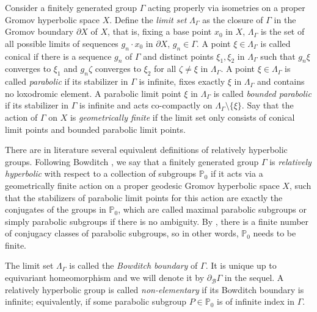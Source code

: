 \documentclass{amsart}
\theoremstyle{definition}
\theoremstyle{remark}
\begin{document}

Consider a finitely generated group $\Gamma$ acting properly via isometries on a proper Gromov hyperbolic space $X$.
Define the \textit{limit set} $\Lambda_\Gamma$ as the closure of $\Gamma$ in the Gromov boundary $\partial X$ of $X$, that is, fixing a base point $x_0$ in $X$, $\Lambda_\Gamma$ is the set of all possible limits of sequences $g_n\cdot x_0$ in $\partial X$, $g_n\in \Gamma$.
A point $\xi\in \Lambda_\Gamma$ is called conical if there is a sequence $g_{n}$ of $\Gamma$ and distinct points $\xi_1,\xi_2$ in $\Lambda_\Gamma$ such that
$g_{n}\xi$ converges to $\xi_1$ and $g_{n}\zeta$ converges to $\xi_2$ for all $\zeta\neq \xi$ in $\Lambda_\Gamma$.
A point $\xi\in \Lambda_\Gamma$ is called \textit{parabolic} if its stabilizer in $\Gamma$ is infinite, fixes exactly $\xi$ in $\Lambda_\Gamma$ and contains no loxodromic element.
A parabolic limit point $\xi$ in $\Lambda_\Gamma$ is called \textit{bounded parabolic} if its stabilizer in $\Gamma$ is infinite and acts co-compactly on $\Lambda_\Gamma \setminus \{\xi\}$.
Say that the action of $\Gamma$ on $X$ is \textit{geometrically finite} if the limit set only consists of conical limit points and bounded parabolic limit points.

There are in literature several equivalent definitions of relatively hyperbolic groups.
Following Bowditch \cite{Bowditch}, we say that a finitely generated group $\Gamma$ is \textit{relatively hyperbolic} with respect to a collection of subgroups $\mathbb P_0$ if it acts via a geometrically finite action on a proper geodesic Gromov hyperbolic space $X$, such that the stabilizers of parabolic limit points for this action are exactly the conjugates of the groups in $\mathbb P_0$,
which are called maximal parabolic subgroups or simply parabolic subgroups if there is no ambiguity.
By \cite[Proposition~6.15]{Bowditch}, there is a finite number of conjugacy classes of parabolic subgroups, so in other words, $\mathbb P_0$ needs to be finite.

The limit set $\Lambda_\Gamma$ is called the \textit{Bowditch boundary} of $\Gamma$.
It is unique up to equivariant homeomorphism and we will denote it by $\partial_\mathcal{B}\Gamma$ in the sequel.
A relatively hyperbolic group is called \textit{non-elementary} if its Bowditch boundary is infinite; equivalently, if some parabolic subgroup $P\in \mathbb P_0$ is of infinite index in $\Gamma$.
\end{document}
